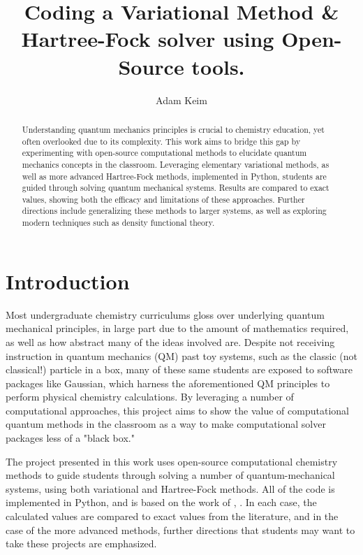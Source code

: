 \documentclass[journal=jacsat,manuscript=communication]{achemso}
\title{Coding a Variational Method \& Hartree-Fock solver using Open-Source tools.}
\author{Adam Keim}
\begin{document}
\begin{abstract}
Understanding quantum mechanics principles is crucial to chemistry education, yet often overlooked due to its complexity.  This work aims to bridge this gap by experimenting with open-source computational methods to elucidate quantum mechanics concepts in the classroom.  Leveraging elementary variational methods, as well as more advanced Hartree-Fock methods, implemented in Python, students are guided through solving quantum mechanical systems.  Results are compared to exact values, showing both the efficacy and limitations of these approaches.  Further directions include generalizing these methods to larger systems, as well as exploring modern techniques such as density functional theory.  \end{abstract}
\section{Introduction}
Most undergraduate chemistry curriculums gloss over underlying quantum mechanical principles, in large part due to the amount of mathematics required, as well as how abstract many of the ideas involved are. Despite not receiving instruction in quantum mechanics (QM) past toy systems, such as the classic (not classical!) particle in a box, many of these same students are exposed to software packages like Gaussian, which harness the aforementioned QM principles to perform physical chemistry calculations.  By leveraging a number of computational approaches, this project aims to show the value of computational quantum methods in the classroom as a way to make computational solver packages less of a "black box."

The project presented in this work uses open-source computational chemistry methods to guide students through solving a number of quantum-mechanical systems, using both variational and Hartree-Fock methods.  All of the code is implemented in Python, and is based on the work of \citet{morgensternUnderstandingQuantumMechanical2023}, \citet{schrierIntroductionComputationalPhysical2017}.  In each case, the calculated values are compared to exact values from the literature, and in the case of the more advanced methods, further directions that students may want to take these projects are emphasized.
\end{document}
